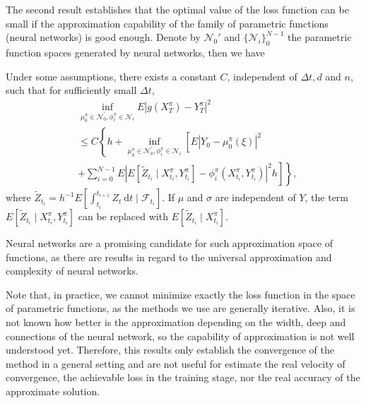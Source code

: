 The second result establishes that the optimal value of the loss function can be small if the approximation capability of the family of parametric functions (neural networks) is good enough. Denote by $\mathcal{N}_0'$ and $\{\mathcal{N}_i\}_{0}^{N-1}$ the parametric function spaces generated by neural networks, then we have
\begin{theorem}
Under some assumptions, there exists a constant $C$, independent of $\Delta t, d$ and $n$, such that for sufficiently small $\Delta t$,
	$$
	\begin{aligned}
		& \inf _{\mu_0^\pi \in \mathcal{N}_0^{\prime}, \phi_i^\pi \in \mathcal{N}_i} E\left|g\left(X_T^\pi\right)-Y_T^\pi\right|^2 \\
		& \leq C\left\{h+\inf _{\mu_0^\pi \in \mathcal{N}_0^{\prime}, \phi_i^\pi \in \mathcal{N}_i}\left[E\left|Y_0-\mu_0^\pi(\xi)\right|^2\right.\right. \\
		&\left.\left.+\sum_{i=0}^{N-1} E\left|E\left[\tilde{Z}_{t_i} \mid X_{t_i}^\pi, Y_{t_i}^\pi\right]-\phi_i^\pi\left(X_{t_i}^\pi, Y_{t_i}^\pi\right)\right|^2 h\right]\right\},
	\end{aligned}
	$$
	where $\tilde{Z}_{t_i}=h^{-1} E\left[\int_{t_i}^{t_{i+1}} Z_t \mathrm{~d} t \mid \mathcal{F}_{t_i}\right]$. If $\mu$ and $\sigma$ are independent of $Y$, the term $E\left[\tilde{Z}_{t_i} \mid X_{t_i}^\pi, Y_{t_i}^\pi\right]$ can be replaced with $E\left[\tilde{Z}_{t_i} \mid X_{t_i}^\pi\right]$.
\end{theorem}

Neural networks are a promising candidate for such approximation space of functions, as there are results in regard
to the universal approximation and complexity of neural networks.

Note that, in practice, we cannot minimize exactly the loss function in the space of parametric functions, as the methods we use are generally iterative. Also, it is not known how better is the approximation depending on the width, deep and connections of the neural network, so the capability of approximation is not well understood yet. Therefore, this results only establish the convergence of the method in a general setting and are not useful for estimate the real velocity of convergence, the achievable loss in the training stage, nor the real accuracy of the approximate solution.  

